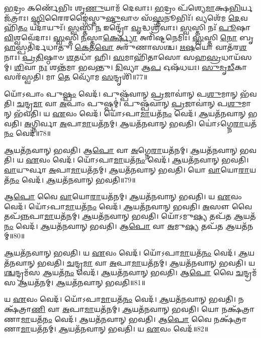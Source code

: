 \-\ul{𑌭}\-𑌦𑍍𑌰𑌂 𑌕𑌰𑍍𑌣𑍇᳴𑌭𑌿𑌃 𑌶𑍃\-\ul{𑌣𑍁}\-𑌯𑌾𑌮᳴ 𑌦𑍇𑌵𑌾𑌃। \ul{𑌭}\-𑌦𑍍𑌰𑌂 𑌪᳴𑌶𑍍𑌯𑍇\-\ul{𑌮𑌾}\-𑌕𑍍𑌷\-\ul{𑌭𑌿}\-𑌰𑍍𑌯𑌜᳴𑌤𑍍𑌰𑌾𑌃। 
\-\ul{𑌸𑍍𑌥𑌿}\-𑌰𑍈𑌰𑌙𑍍𑌗𑍈॑𑌸𑍍𑌤𑍁\-\ul{𑌷𑍍𑌟𑍁}\-𑌵𑌾𑍞 𑌸᳴\-\ul{𑌸𑍍𑌤}\-𑌨𑍂𑌭𑌿𑌃᳴। 𑌵𑍍𑌯𑌶𑍇᳴𑌮 \ul{𑌦𑍇}\-𑌵𑌹𑌿᳴\-\ul{𑌤𑌂} 𑌯𑌦𑌾𑌯𑍁𑌃᳴। 
\-\ul{𑌸𑍍𑌵}\-𑌸𑍍𑌤𑌿 \ul{𑌨} 𑌇𑌨𑍍𑌦𑍍𑌰𑍋᳴ \ul{𑌵𑍃}\-𑌦𑍍𑌧𑌶𑍍𑌰᳴𑌵𑌾𑌃। \ul{𑌸𑍍𑌵}\-𑌸𑍍𑌤𑌿 𑌨𑌃᳴ \ul{𑌪𑍂}\-𑌷𑌾 \ul{𑌵𑌿}\-𑌶𑍍𑌵𑌵𑍇᳴𑌦𑌾𑌃। 
\-\ul{𑌸𑍍𑌵}\-𑌸𑍍𑌤𑌿 \ul{𑌨}\-𑌸𑍍𑌤𑌾\-\ul{𑌰𑍍𑌕𑍍𑌷𑍍𑌯𑍋} 𑌅𑌰𑌿᳴𑌷𑍍𑌟𑌨𑍇𑌮𑌿𑌃। \ul{𑌸𑍍𑌵}\-𑌸𑍍𑌤𑌿 \ul{𑌨𑍋} 𑌬𑍃\-\ul{𑌹}\-𑌸𑍍𑌪𑌤𑌿᳴𑌰𑍍𑌦𑌧𑌾𑌤𑍁। 
\-\ul{𑌕𑍇}\-𑌤\-\ul{𑌵𑍋} 𑌅𑌰𑍁᳴𑌣𑌾𑌸𑌶𑍍𑌚। \ul{𑌋}\-\-\ul{𑌷}\-𑌯𑍋 𑌵𑌾𑌤᳴𑌰\-\ul{𑌶}\-𑌨𑌾𑌃। 
\-\ul{𑌪𑍍𑌰}\-\-\ul{𑌤𑌿}\-𑌷𑍍𑌠𑌾𑍞 \ul{𑌶}\-𑌤𑌧𑌾᳴ 𑌹𑌿। \ul{𑌸}\-𑌮𑌾𑌹𑌿᳴𑌤𑌾𑌸𑍋 𑌸𑌹\-\ul{𑌸𑍍𑌰}\-𑌧𑌾𑌯᳴𑌸𑌮𑍍। 
\-\ul{𑌶𑌿}\-𑌵𑌾 \ul{𑌨𑌃} 𑌶𑌨𑍍𑌤᳴𑌮𑌾 𑌭𑌵𑌨𑍍𑌤𑍁। \ul{𑌦𑌿}\-𑌵𑍍𑌯𑌾 𑌆\-\ul{𑌪} 𑌓𑌷᳴𑌧𑌯𑌃। 
\-\ul{𑌸𑍁}\-\-\ul{𑌮𑍃}\-\-\ul{𑌡𑍀}\-𑌕𑌾 𑌸𑌰᳴𑌸𑍍𑌵𑌤𑌿। 𑌮𑌾 \ul{𑌤𑍇} 𑌵𑍍𑌯𑍋᳴𑌮 \ul{𑌸}\-𑌨𑍍𑌦𑍃𑌶𑌿᳴॥77॥\anuvakamend


𑌯𑍋᳴𑌽𑌪𑌾𑌂 𑌪𑍁\-\ul{𑌷𑍍𑌪𑌂} 𑌵𑍇𑌦᳴। 𑌪𑍁𑌷𑍍𑌪᳴𑌵𑌾𑌨𑍍‌ \ul{𑌪𑍍𑌰}\-𑌜𑌾𑌵𑌾॑𑌨𑍍 𑌪\-\ul{𑌶𑍁}\-𑌮𑌾𑌨𑍍 𑌭᳴𑌵𑌤𑌿। 
\-\ul{𑌚}\-𑌨𑍍𑌦𑍍𑌰\-\ul{𑌮𑌾} 𑌵𑌾 \ul{𑌅}\-𑌪𑌾𑌂 𑌪𑍁𑌷𑍍𑌪𑌮𑍍॑। 𑌪𑍁𑌷𑍍𑌪᳴𑌵𑌾𑌨𑍍 \ul{𑌪𑍍𑌰}\-𑌜𑌾𑌵𑌾॑𑌨𑍍 𑌪\-\ul{𑌶𑍁}\-𑌮𑌾𑌨𑍍‌ 𑌭᳴𑌵𑌤𑌿। 
𑌯 \ul{𑌏}\-𑌵𑌂 𑌵𑍇𑌦᳴। 𑌯𑍋᳴𑌽𑌪𑌾\-\ul{𑌮𑌾}\-𑌯𑌤᳴\-\ul{𑌨𑌂} 𑌵𑍇𑌦᳴। 
\-\ul{𑌆}\-𑌯𑌤᳴𑌨𑌵𑌾𑌨𑍍‌ 𑌭𑌵𑌤𑌿। \ul{𑌅}\-𑌗𑍍𑌨𑌿𑌰𑍍𑌵𑌾 \ul{𑌅}\-𑌪𑌾\-\ul{𑌮𑌾}\-𑌯𑌤᳴𑌨𑌮𑍍। 
\-\ul{𑌆}\-𑌯𑌤᳴𑌨𑌵𑌾𑌨𑍍‌ 𑌭𑌵𑌤𑌿। 𑌯𑍋॑𑌽𑌗𑍍𑌨𑍇\-\ul{𑌰𑌾}\-𑌯𑌤᳴\-\ul{𑌨𑌂} 𑌵𑍇𑌦᳴॥78॥


\-\ul{𑌆}\-𑌯𑌤᳴𑌨𑌵𑌾𑌨𑍍‌ 𑌭𑌵𑌤𑌿। 𑌆\-\ul{𑌪𑍋} 𑌵𑌾 \ul{𑌅}\-𑌗𑍍𑌨𑍇\-\ul{𑌰𑌾}\-𑌯𑌤᳴𑌨𑌮𑍍। 
\-\ul{𑌆}\-𑌯𑌤᳴𑌨𑌵𑌾𑌨𑍍‌ 𑌭𑌵𑌤𑌿। 𑌯 \ul{𑌏}\-𑌵𑌂 𑌵𑍇𑌦᳴। 
𑌯𑍋᳴𑌽𑌪𑌾\-\ul{𑌮𑌾}\-𑌯𑌤᳴\-\ul{𑌨𑌂} 𑌵𑍇𑌦᳴। \ul{𑌆}\-𑌯𑌤᳴𑌨𑌵𑌾𑌨𑍍‌ 𑌭𑌵𑌤𑌿। 
\-\ul{𑌵𑌾}\-𑌯𑍁𑌰𑍍𑌵𑌾 \ul{𑌅}\-𑌪𑌾\-\ul{𑌮𑌾}\-𑌯𑌤᳴𑌨𑌮𑍍। \ul{𑌆}\-𑌯𑌤᳴𑌨𑌵𑌾𑌨𑍍‌ 𑌭𑌵𑌤𑌿। 
𑌯𑍋 \ul{𑌵𑌾}\-𑌯𑍋\-\ul{𑌰𑌾}\-𑌯𑌤᳴\-\ul{𑌨𑌂} 𑌵𑍇𑌦᳴। \ul{𑌆}\-𑌯𑌤᳴𑌨𑌵𑌾𑌨𑍍‌ 𑌭𑌵𑌤𑌿॥79॥


𑌆\-\ul{𑌪𑍋} 𑌵𑍈 \ul{𑌵𑌾}\-𑌯𑍋\-\ul{𑌰𑌾}\-𑌯𑌤᳴𑌨𑌮𑍍। \ul{𑌆}\-𑌯𑌤᳴𑌨𑌵𑌾𑌨𑍍‌ 𑌭𑌵𑌤𑌿। 
𑌯 \ul{𑌏}\-𑌵𑌂 𑌵𑍇𑌦᳴। 𑌯𑍋᳴𑌽𑌪𑌾\-\ul{𑌮𑌾}\-𑌯𑌤᳴\-\ul{𑌨𑌂} 𑌵𑍇𑌦᳴। 
\-\ul{𑌆}\-𑌯𑌤᳴𑌨𑌵𑌾𑌨𑍍‌ 𑌭𑌵𑌤𑌿। \ul{𑌅}\-𑌸𑍗 𑌵𑍈 𑌤𑌪᳴\-\ul{𑌨𑍍𑌨}\-𑌪𑌾\-\ul{𑌮𑌾}\-𑌯𑌤᳴𑌨𑌮𑍍। 
\-\ul{𑌆}\-𑌯𑌤᳴𑌨𑌵𑌾𑌨𑍍‌ 𑌭𑌵𑌤𑌿। 𑌯𑍋᳴𑌽𑌮𑍁\-\ul{𑌷𑍍𑌯} 𑌤𑌪᳴𑌤 \ul{𑌆}\-𑌯𑌤᳴\-\ul{𑌨𑌂} 𑌵𑍇𑌦᳴। 
\-\ul{𑌆}\-𑌯𑌤᳴𑌨𑌵𑌾𑌨𑍍‌ 𑌭𑌵𑌤𑌿। 𑌆\-\ul{𑌪𑍋} 𑌵𑌾 \ul{𑌅}\-𑌮𑍁\-\ul{𑌷𑍍𑌯} 𑌤𑌪᳴𑌤 \ul{𑌆}\-𑌯𑌤᳴𑌨𑌮𑍍॥80॥


\-\ul{𑌆}\-𑌯𑌤᳴𑌨𑌵𑌾𑌨𑍍‌ 𑌭𑌵𑌤𑌿। 𑌯 \ul{𑌏}\-𑌵𑌂 𑌵𑍇𑌦᳴। 
𑌯𑍋᳴𑌽𑌪𑌾\-\ul{𑌮𑌾}\-𑌯𑌤᳴\-\ul{𑌨𑌂} 𑌵𑍇𑌦᳴। \ul{𑌆}\-𑌯𑌤᳴𑌨𑌵𑌾𑌨𑍍‌ 𑌭𑌵𑌤𑌿। 
\-\ul{𑌚}\-𑌨𑍍𑌦𑍍𑌰\-\ul{𑌮𑌾} 𑌵𑌾 \ul{𑌅}\-𑌪𑌾\-\ul{𑌮𑌾}\-𑌯𑌤᳴𑌨𑌮𑍍। \ul{𑌆}\-𑌯𑌤᳴𑌨𑌵𑌾𑌨𑍍‌ 𑌭𑌵𑌤𑌿। 
𑌯\-\ul{𑌶𑍍𑌚}\-𑌨𑍍𑌦𑍍𑌰𑌮᳴𑌸 \ul{𑌆}\-𑌯𑌤᳴\-\ul{𑌨𑌂} 𑌵𑍇𑌦᳴। \ul{𑌆}\-𑌯𑌤᳴𑌨𑌵𑌾𑌨𑍍‌ 𑌭𑌵𑌤𑌿। 
𑌆\-\ul{𑌪𑍋} 𑌵𑍈 \ul{𑌚}\-𑌨𑍍𑌦𑍍𑌰𑌮᳴𑌸 \ul{𑌆}\-𑌯𑌤᳴𑌨𑌮𑍍। \ul{𑌆}\-𑌯𑌤᳴𑌨𑌵𑌾𑌨𑍍‌ 𑌭𑌵𑌤𑌿॥81॥


𑌯 \ul{𑌏}\-𑌵𑌂 𑌵𑍇𑌦᳴। 𑌯𑍋᳴𑌽𑌪𑌾\-\ul{𑌮𑌾}\-𑌯𑌤᳴\-\ul{𑌨𑌂} 𑌵𑍇𑌦᳴। 
\-\ul{𑌆}\-𑌯𑌤᳴𑌨𑌵𑌾𑌨𑍍‌ 𑌭𑌵𑌤𑌿। 𑌨𑌕𑍍𑌷᳴𑌤𑍍𑌰𑌾\-\ul{𑌣𑌿} 𑌵𑌾 \ul{𑌅}\-𑌪𑌾\-\ul{𑌮𑌾}\-𑌯𑌤᳴𑌨𑌮𑍍। 
\-\ul{𑌆}\-𑌯𑌤᳴𑌨𑌵𑌾𑌨𑍍‌ 𑌭𑌵𑌤𑌿। 𑌯𑍋 𑌨𑌕𑍍𑌷᳴𑌤𑍍𑌰𑌾𑌣𑌾\-\ul{𑌮𑌾}\-𑌯𑌤᳴\-\ul{𑌨𑌂} 𑌵𑍇𑌦᳴। 
\-\ul{𑌆}\-𑌯𑌤᳴𑌨𑌵𑌾𑌨𑍍‌ 𑌭𑌵𑌤𑌿। 𑌆\-\ul{𑌪𑍋} 𑌵𑍈 𑌨𑌕𑍍𑌷᳴𑌤𑍍𑌰𑌾𑌣𑌾\-\ul{𑌮𑌾}\-𑌯𑌤᳴𑌨𑌮𑍍। 
\-\ul{𑌆}\-𑌯𑌤᳴𑌨𑌵𑌾𑌨𑍍‌ 𑌭𑌵𑌤𑌿। 𑌯 \ul{𑌏}\-𑌵𑌂 𑌵𑍇𑌦᳴॥82॥



